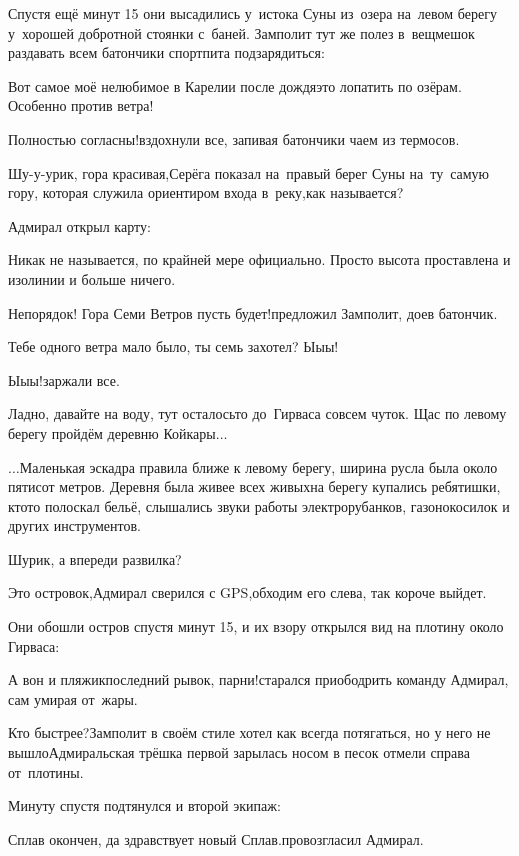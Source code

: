 Спустя ещё минут 15 они высадились у~истока Суны из~озера на~левом берегу у~хорошей добротной стоянки с~баней. Замполит тут же полез в~вещмешок раздавать всем батончики спортпита подзарядиться:

\diagdash Вот самое моё нелюбимое в Карелии после дождя\mdash это лопатить по озёрам. Особенно против ветра!

\diagdash Полностью согласны!\mdash вздохнули все, запивая батончики чаем из термосов. 

\diagdash Шу-у-урик, гора красивая,\mdash Серёга показал на~правый берег Суны на~ту~самую гору, которая служила ориентиром входа в~реку,\mdash как называется?

Адмирал открыл карту:

\diagdash Никак не называется, по крайней мере официально. Просто высота проставлена и изолинии и больше ничего.

\diagdash Непорядок! Гора Семи Ветров пусть будет!\mdash предложил Замполит, доев батончик.

\diagdash Тебе одного ветра мало было, ты семь захотел? Ы\sdash ы\sdash ы!

\diagdash Ы\sdash ы\sdash ы!\mdash заржали все.

\diagdash Ладно, давайте на воду, тут осталось\sdash то до~Гирваса совсем чуток. Щас по левому берегу пройдём деревню Койкары$\ldots$

$\ldots$Маленькая эскадра правила ближе к левому берегу, ширина русла была около пятисот метров. Деревня была живее всех живых\mdash на берегу купались ребятишки, кто\sdash то полоскал бельё, слышались звуки работы электрорубанков, газонокосилок и других инструментов.

\diagdash Шурик, а впереди развилка?

\diagdash Это островок,\mdash Адмирал сверился с GPS,\mdash обходим его слева, так короче выйдет.

Они обошли остров спустя минут 15, и их взору открылся вид на плотину около Гирваса:

\diagdash А вон и пляжик\mdash последний рывок, парни!\mdash старался приободрить команду Адмирал, сам умирая от~жары.

\diagdash Кто быстрее?\mdash Замполит в своём стиле хотел как всегда потягаться, но у него не вышло\mdash Адмиральская трёшка первой зарылась носом в песок отмели справа от~плотины.

Минуту спустя подтянулся и второй экипаж:

\diagdash Сплав окончен, да здравствует новый Сплав.\mdash провозгласил Адмирал.

